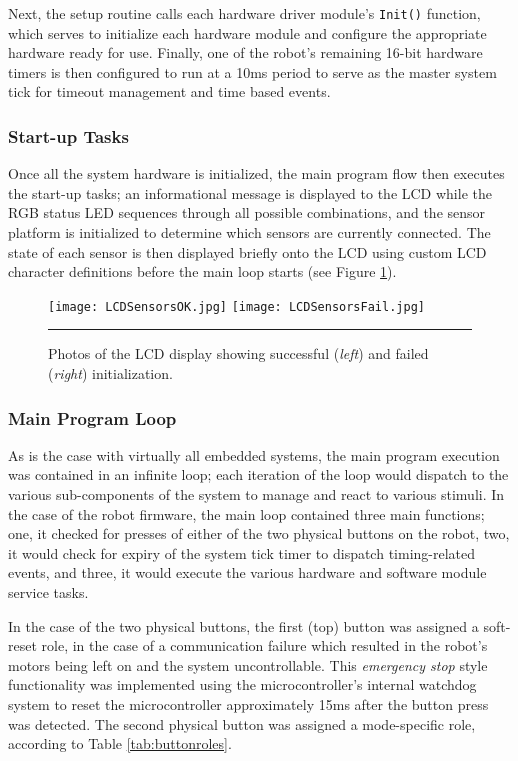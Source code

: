 Next, the setup routine calls each hardware driver module's \lstinline{Init()} function, which serves to initialize each hardware module and configure the appropriate hardware ready for use. Finally, one of the robot's remaining 16-bit hardware timers is then configured to run at a 10ms period to serve as the master system tick for timeout management and time based events.

\FloatBarrier
\subsubsection{Start-up Tasks}

Once all the system hardware is initialized, the main program flow then executes the start-up tasks; an informational message is displayed to the LCD while the RGB status LED sequences through all possible combinations, and the sensor platform is initialized to determine which sensors are currently connected. The state of each sensor is then displayed briefly onto the LCD using custom LCD character definitions before the main loop starts (see Figure \ref{fig:sensorinitlcd}).

\begin{figure}[tbph]
	\vspace{1em}
	\centering
		\texttt{[image: LCDSensorsOK.jpg]}
		\texttt{[image: LCDSensorsFail.jpg]}
	\rule{35em}{0.5pt}
	\caption[LCD Sensor Status Information]{Photos of the LCD display showing successful (\textit{left}) and failed (\textit{right}) initialization.}
	\label{fig:sensorinitlcd}
\end{figure}

\FloatBarrier
\subsubsection{Main Program Loop}

As is the case with virtually all embedded systems, the main program execution was contained in an infinite loop; each iteration of the loop would dispatch to the various sub-components of the system to manage and react to various stimuli. In the case of the robot firmware, the main loop contained three main functions; one, it checked for presses of either of the two physical buttons on the robot, two, it would check for expiry of the system tick timer to dispatch timing-related events, and three, it would execute the various hardware and software module service tasks.

In the case of the two physical buttons, the first (top) button was assigned a soft-reset role, in the case of a communication failure which resulted in the robot's motors being left on and the system uncontrollable. This \textit{emergency stop} style functionality was implemented using the microcontroller's internal watchdog system to reset the microcontroller approximately 15ms after the button press was detected. The second physical button was assigned a mode-specific role, according to Table \ref{tab:buttonroles}.

